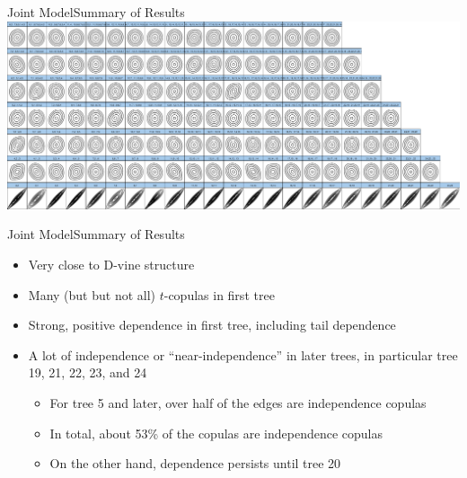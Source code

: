 \begin{frame}{Joint Model}{Summary of Results}
  \includegraphics[width=\textwidth]{img/vine-densities}
\end{frame}

\begin{frame}{Joint Model}{Summary of Results}
  \begin{itemize}
  \item<2-> Very close to D-vine structure
  \item<3-> Many (but but not all) \(t\)-copulas in first tree
  \item<4-> Strong, positive dependence in first tree, including tail dependence
  \item<5-> A lot of independence or ``near-independence'' in later trees, in particular tree 19, 21, 22, 23, and 24
    \begin{itemize}
    \item For tree 5 and later, over half of the edges are independence copulas
    \item In total, about 53\% of the copulas are independence copulas
    \item On the other hand, dependence persists until tree 20
    \end{itemize}
  \end{itemize}
\end{frame}


